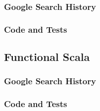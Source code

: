 \documentclass[letterpaper, 10pt, DIV=13]{scrartcl}
\numberwithin{equation}{section}
\numberwithin{figure}{section}
\numberwithin{table}{section}
\begin{document}
\subsubsection{Google Search History}

\subsubsection{Code and Tests}

\subsection{Functional Scala}

\subsubsection{Google Search History}

\subsubsection{Code and Tests}
\end{document}

